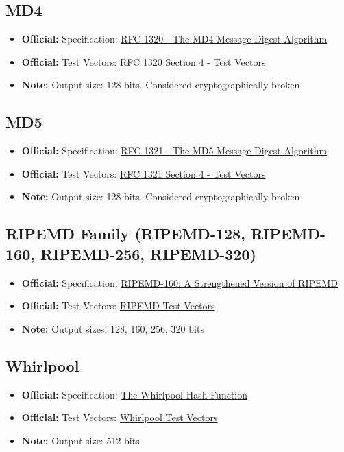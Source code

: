 \documentclass[12pt,a4paper]{article}
\newcommand{\official}[1]{\textcolor{citegreen}{\textbf{Official:}} #1}
\newcommand{\note}[1]{\textcolor{noteorange}{\textbf{Note:}} #1}
\newcommand{\link}[2]{\href{#1}{#2}}
\begin{document}
\subsection{MD4}
\begin{itemize}
    \item \official{Specification:} \link{https://tools.ietf.org/html/rfc1320}{RFC 1320 - The MD4 Message-Digest Algorithm}
    \item \official{Test Vectors:} \link{https://tools.ietf.org/html/rfc1320#section-4}{RFC 1320 Section 4 - Test Vectors}
    \item \note{Output size: 128 bits. Considered cryptographically broken}
\end{itemize}

\subsection{MD5}
\begin{itemize}
    \item \official{Specification:} \link{https://tools.ietf.org/html/rfc1321}{RFC 1321 - The MD5 Message-Digest Algorithm}
    \item \official{Test Vectors:} \link{https://tools.ietf.org/html/rfc1321#section-4}{RFC 1321 Section 4 - Test Vectors}
    \item \note{Output size: 128 bits. Considered cryptographically broken}
\end{itemize}

\subsection{RIPEMD Family (RIPEMD-128, RIPEMD-160, RIPEMD-256, RIPEMD-320)}
\begin{itemize}
    \item \official{Specification:} \link{https://homes.esat.kuleuven.be/~bosselae/ripemd160.html}{RIPEMD-160: A Strengthened Version of RIPEMD}
    \item \official{Test Vectors:} \link{https://homes.esat.kuleuven.be/~bosselae/ripemd160.html}{RIPEMD Test Vectors}
    \item \note{Output sizes: 128, 160, 256, 320 bits}
\end{itemize}

\subsection{Whirlpool}
\begin{itemize}
    \item \official{Specification:} \link{https://web.archive.org/web/20171129084214/http://www.larc.usp.br/~pbarreto/WhirlpoolPage.html}{The Whirlpool Hash Function}
    \item \official{Test Vectors:} \link{https://web.archive.org/web/20171129084214/http://www.larc.usp.br/~pbarreto/WhirlpoolPage.html}{Whirlpool Test Vectors}
    \item \note{Output size: 512 bits}
\end{itemize}
\end{document}
